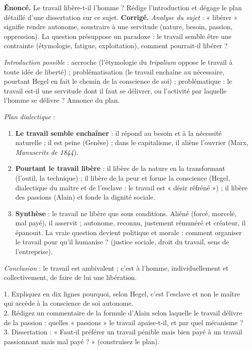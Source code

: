 \documentclass[11pt]{article}
\begin{document}
\begin{exoresolu}
\textbf{Énoncé.} Le travail libère-t-il l'homme ? Rédige l'introduction et dégage le plan détaillé d'une dissertation sur ce sujet.
\tcblower
\textbf{Corrigé.} \emph{Analyse du sujet} : « libérer » signifie rendre autonome, soustraire à une servitude (nature, besoin, passion, oppression). La question présuppose un paradoxe : le travail semble être une contrainte (étymologie, fatigue, exploitation), comment pourrait-il libérer ?

\emph{Introduction possible} : accroche (l'étymologie du \emph{tripalium} oppose le travail à toute idée de liberté) ; problématisation (le travail enchaîne au nécessaire, pourtant Hegel en fait le chemin de la conscience de soi) ; problématique : le travail est-il une servitude dont il faut se délivrer, ou l'activité par laquelle l'homme se délivre ? Annonce du plan.

\emph{Plan dialectique} :
\begin{enumerate}
\item \textbf{Le travail semble enchaîner} : il répond au besoin et à la nécessité naturelle ; il est peine (Genèse) ; dans le capitalisme, il aliène l'ouvrier (Marx, \emph{Manuscrits de 1844}).
\item \textbf{Pourtant le travail libère} : il libère de la nature en la transformant (l'outil, la technique) ; il libère de la peur et forme la conscience (Hegel, dialectique du maître et de l'esclave : le travail est « désir réfréné ») ; il libère des passions (Alain) et fonde la dignité sociale.
\item \textbf{Synthèse} : le travail ne libère que sous conditions. Aliéné (forcé, morcelé, mal payé), il asservit ; autonome, reconnu, justement rémunéré et créateur, il épanouit. La vraie question devient politique et morale : comment organiser le travail pour qu'il humanise ? (justice sociale, droit du travail, sens de l'entreprise).
\end{enumerate}
\emph{Conclusion} : le travail est ambivalent ; c'est à l'homme, individuellement et collectivement, de faire de lui une libération.
\end{exoresolu}

\begin{exercice}
1. Expliquez en dix lignes pourquoi, selon Hegel, c'est l'esclave et non le maître qui accède à la conscience de soi autonome.\\
2. Rédigez un commentaire de la formule d'Alain selon laquelle le travail délivre de la passion : quelles « passions » le travail apaise-t-il, et par quel mécanisme ?\\
3. Dissertation : « Faut-il préférer un travail pénible mais bien payé à un travail passionnant mais mal payé ? » (construisez le plan).
\end{exercice}
\end{document}
